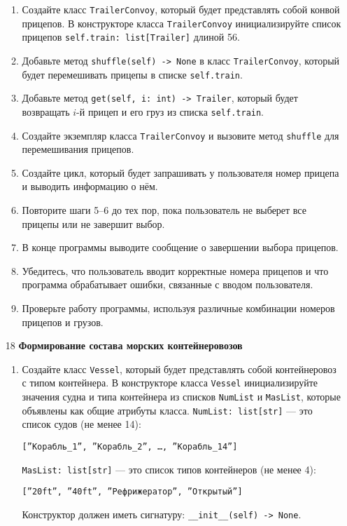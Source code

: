 \begin{enumerate}
\begin{enumerate}
    \item Создайте класс \texttt{TrailerConvoy}, который будет представлять собой конвой прицепов. В конструкторе класса \texttt{TrailerConvoy} инициализируйте список прицепов \texttt{self.train: list[Trailer]} длиной 56.

    \item Добавьте метод \texttt{shuffle(self) -> None} в класс \texttt{TrailerConvoy}, который будет перемешивать прицепы в списке \texttt{self.train}.

    \item Добавьте метод \texttt{get(self, i: int) -> Trailer}, который будет возвращать $i$-й прицеп и его груз из списка \texttt{self.train}.

    \item Создайте экземпляр класса \texttt{TrailerConvoy} и вызовите метод \texttt{shuffle} для перемешивания прицепов.

    \item Создайте цикл, который будет запрашивать у пользователя номер прицепа и выводить информацию о нём.

    \item Повторите шаги 5–6 до тех пор, пока пользователь не выберет все прицепы или не завершит выбор.

    \item В конце программы выводите сообщение о завершении выбора прицепов.

    \item Убедитесь, что пользователь вводит корректные номера прицепов и что программа обрабатывает ошибки, связанные с вводом пользователя.

    \item Проверьте работу программы, используя различные комбинации номеров прицепов и грузов.
\end{enumerate}

\item[18] \textbf{Формирование состава морских контейнеровозов}
\begin{enumerate}
    \item Создайте класс \texttt{Vessel}, который будет представлять собой контейнеровоз с типом контейнера. В конструкторе класса \texttt{Vessel} инициализируйте значения судна и типа контейнера из списков \texttt{NumList} и \texttt{MasList}, которые объявлены как общие атрибуты класса. \texttt{NumList: list[str]} — это список судов (не менее 14): 
    \begin{center}
        \texttt{[''Корабль\_1'', ''Корабль\_2'', \dots, ''Корабль\_14'']}
    \end{center}
    \texttt{MasList: list[str]} — это список типов контейнеров (не менее 4):
    \begin{center}
        \texttt{[''20ft'', ''40ft'', ''Рефрижератор'', ''Открытый'']}
    \end{center}
    Конструктор должен иметь сигнатуру: \texttt{\_\_init\_\_(self) -> None}.


\end{enumerate}
\end{enumerate}

